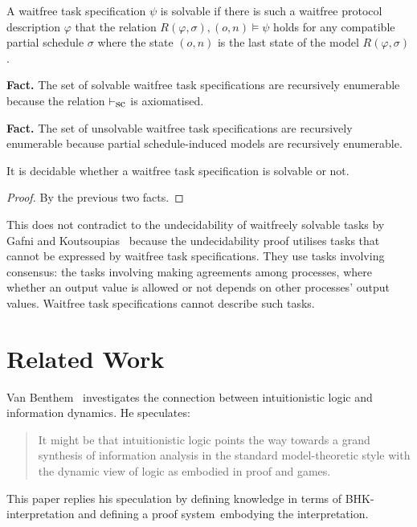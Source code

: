   \begin{definition}
   A waitfree task specification $\psi$ is solvable if there is such a
   waitfree protocol description $\varphi$ that the relation
   $R(\varphi,\sigma), (o,n)\models\psi$ holds for any compatible partial
   schedule $\sigma$ where the state $(o,n)$ is the last state of the
   model $R(\varphi,\sigma)$.
  \end{definition}

  \noindent \textbf{Fact.} The set of solvable waitfree task specifications are
  recursively enumerable because the relation $\vdash_{\mbox{\rm sc}}$ is axiomatised.

  \noindent \textbf{Fact.} The set of unsolvable waitfree task
  specifications are recursively enumerable because partial schedule-induced
  models are recursively enumerable.

  \begin{proposition}
   \label{wf-dec}
   It is decidable whether a waitfree task
   specification is solvable or not.
  \end{proposition}
  \begin{proof}
   By the previous two facts.
  \end{proof}

  This does not contradict to the undecidability
  of waitfreely solvable tasks by Gafni and
  Koutsoupias~\cite{gafni1999three}
  because the undecidability proof
  utilises tasks that cannot be expressed by waitfree task specifications.
  They use tasks involving consensus:
  the tasks involving making agreements among processes, where
  whether an output value is allowed or not depends on other processes'
  output values.  Waitfree task specifications cannot describe such tasks.

 \section{Related Work}
 \label{first:related}

 Van Benthem~\cite{van2009information} investigates the connection between
 intuitionistic logic and information dynamics.  He speculates:
 \begin{quotation}
  It might be
  that intuitionistic logic points the way towards a grand synthesis of information analysis
  in the standard model-theoretic style with the dynamic view of logic as embodied
  in proof and games.
 \end{quotation}
 This paper replies his speculation by defining knowledge in terms of BHK-interpretation
 and defining a proof system \iec\,embodying the interpretation.


